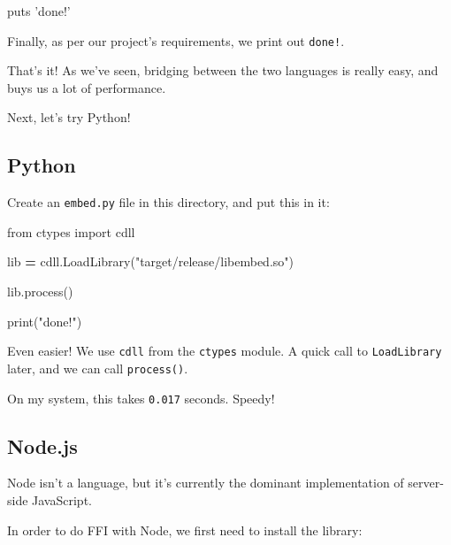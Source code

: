 \documentclass[a4paper,]{book}
\newenvironment{Shaded}{\begin{snugshade}}{\end{snugshade}}
\newcommand{\KeywordTok}[1]{\textcolor[rgb]{0.13,0.29,0.53}{\textbf{{#1}}}}
\newcommand{\StringTok}[1]{\textcolor[rgb]{0.31,0.60,0.02}{{#1}}}
\newcommand{\ImportTok}[1]{{#1}}
\newcommand{\OperatorTok}[1]{\textcolor[rgb]{0.81,0.36,0.00}{\textbf{{#1}}}}
\newcommand{\BuiltInTok}[1]{{#1}}
\newcommand{\NormalTok}[1]{{#1}}
\begin{document}
\begin{Shaded}
\begin{Highlighting}[]
\NormalTok{puts }\StringTok{'done!'}
\end{Highlighting}
\end{Shaded}

Finally, as per our project's requirements, we print out \texttt{done!}.

That's it! As we've seen, bridging between the two languages is really
easy, and buys us a lot of performance.

Next, let's try Python!

\subsection{Python}\label{python}

Create an \texttt{embed.py} file in this directory, and put this in it:

\begin{Shaded}
\begin{Highlighting}[]
\ImportTok{from} \NormalTok{ctypes }\ImportTok{import} \NormalTok{cdll}

\NormalTok{lib }\OperatorTok{=} \NormalTok{cdll.LoadLibrary(}\StringTok{"target/release/libembed.so"}\NormalTok{)}

\NormalTok{lib.process()}

\BuiltInTok{print}\NormalTok{(}\StringTok{"done!"}\NormalTok{)}
\end{Highlighting}
\end{Shaded}

Even easier! We use \texttt{cdll} from the \texttt{ctypes} module. A
quick call to \texttt{LoadLibrary} later, and we can call
\texttt{process()}.

On my system, this takes \texttt{0.017} seconds. Speedy!

\subsection{Node.js}\label{node.js}

Node isn't a language, but it's currently the dominant implementation of
server-side JavaScript.

In order to do FFI with Node, we first need to install the library:

\begin{Shaded}
\end{Shaded}
\end{document}
